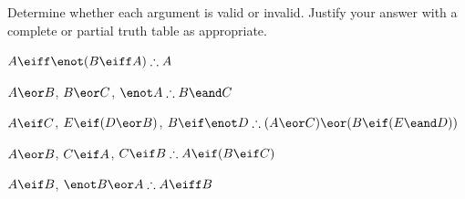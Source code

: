 \noindent\problempart Determine whether each argument is valid or invalid. Justify your answer with a complete or partial truth table as appropriate.
\label{pr.TT.valid6} 
\begin{compactlist}
\item $A\eiff\enot(B\eiff A)\therefore A$ %
\item $A\eor B$, $B\eor C$, $\enot A\therefore B \eand C$ %
\item $A \eif C$, $E \eif (D \eor B)$, $B \eif \enot D\therefore (A \eor C) \eor (B \eif (E \eand D))$ %
\item $A \eor B$, $C \eif A$, $C \eif B\therefore A \eif (B \eif C)$ %
\item $A \eif B$, $\enot B \eor A\therefore A \eiff B$ %
\end{compactlist}

